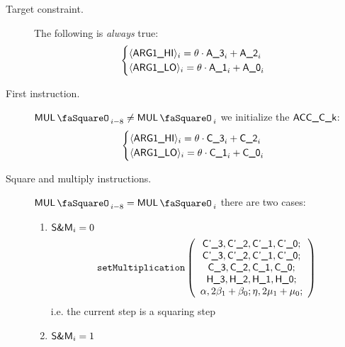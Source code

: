 \begin{center}
\end{center}
\begin{description}
	\item[Target constraint.] The following is \emph{always} true:
	\[
	\begin{cases}
		\langle{}\textsf{ARG}\textsf{1}\textsf{\_HI}\rangle{}_{i} = \theta \cdot \textsf{A\_3}_{i} + \textsf{A\_2}_{i} \\
		\langle{}\textsf{ARG}\textsf{1}\textsf{\_LO}\rangle{}_{i} = \theta \cdot \textsf{A\_1}_{i} + \textsf{A\_0}_{i} \\
	\end{cases}
	\]
	\item[First instruction.] \If $\mulStamp_{i-8} \neq \mulStamp_{i}$ \Then we initialize the $\textsf{ACC}\textsf{\_C\_k}$:
	\[
	\begin{cases}
		\langle{}\textsf{ARG}\textsf{1}\textsf{\_HI}\rangle{}_{i} = \theta \cdot \textsf{C\_3}_{i} + \textsf{C\_2}_{i} \\
		\langle{}\textsf{ARG}\textsf{1}\textsf{\_LO}\rangle{}_{i} = \theta \cdot \textsf{C\_1}_{i} + \textsf{C\_0}_{i} \\
	\end{cases}
	\]
	\item[Square and multiply instructions.] \If $\mulStamp_{i-8} = \mulStamp_{i}$ \Then
	there are two cases:
	\begin{enumerate}
		\item \If $\textsf{S\&M}_{i} = 0$ \Then
		\[
			\texttt{setMultiplication}
			\left(
			\begin{array}{c}
			\textsf{C'\_3}, \textsf{C'\_2}, \textsf{C'\_1}, \textsf{C'\_0}; \\
			\textsf{C'\_3}, \textsf{C'\_2}, \textsf{C'\_1}, \textsf{C'\_0}; \\
			\textsf{C\_3}, \textsf{C\_2}, \textsf{C\_1}, \textsf{C\_0}; \\
			\textsf{H\_3}, \textsf{H\_2}, \textsf{H\_1}, \textsf{H\_0}; \\
			\alpha, 2\beta_{1} + \beta_{0};
			\eta, 2\mu_{1} + \mu_{0}; \\
			\end{array}
			\right)
		\]
		i.e. the current step is a squaring step
		\item \If $\textsf{S\&M}_{i} = 1$ \Then

\end{enumerate}
\end{description}
